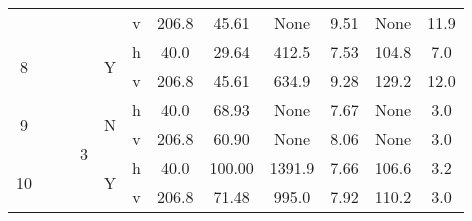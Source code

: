 \documentclass[]{article}
\begin{document}
\begin{table}[]
\begin{tabular}{|c|c|c|c|c|c|c|c|c|c|c|c|}
                           &                     &                       &                      &                                         & v         & 206.8               & 45.61            & None             & 9.51             & None             & 11.9            \\
\multirow{2}{*}{8}         &                     &                       &                      & \multirow{2}{*}{Y}                      & h         & 40.0                & 29.64            & 412.5            & 7.53             & 104.8            & 7.0             \\
                           &                     &                       &                      &                                         & v         & 206.8               & 45.61            & 634.9            & 9.28             & 129.2            & 12.0            \\
\multirow{2}{*}{9}         &                     &                       & \multirow{4}{*}{3}   & \multirow{2}{*}{N}                      & h         & 40.0                & 68.93            & None             & 7.67             & None             & 3.0             \\
                           &                     &                       &                      &                                         & v         & 206.8               & 60.90            & None             & 8.06             & None             & 3.0             \\
\multirow{2}{*}{10}        &                     &                       &                      & \multirow{2}{*}{Y}                      & h         & 40.0                & 100.00           & 1391.9           & 7.66             & 106.6            & 3.2             \\
                           &                     &                       &                      &                                         & v         & 206.8               & 71.48            & 995.0            & 7.92             & 110.2            & 3.0            
\end{tabular}
\end{table}





\end{document}
